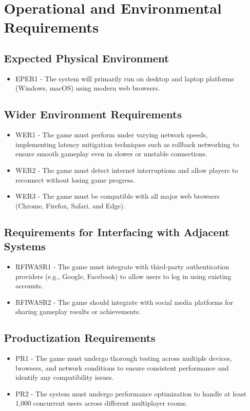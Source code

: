 \documentclass{article}
\begin{document}
\section{Operational and Environmental Requirements}

\subsection{Expected Physical Environment}
\begin{itemize}
    \item EPER1 - The system will primarily run on desktop and laptop platforms (Windows, macOS) using modern web browsers.
\end{itemize}

\subsection{Wider Environment Requirements}
\begin{itemize}
    \item WER1 - The game must perform under varying network speeds, implementing latency mitigation techniques such as rollback networking to ensure smooth gameplay even in slower or unstable connections.
    \item WER2 - The game must detect internet interruptions and allow players to reconnect without losing game progress.
    \item WER3 - The game must be compatible with all major web browsers (Chrome, Firefox, Safari, and Edge).
\end{itemize}

\subsection{Requirements for Interfacing with Adjacent Systems}
\begin{itemize}
    \item RFIWASR1 - The game must integrate with third-party authentication providers (e.g., Google, Facebook) to allow users to log in using existing accounts.
    \item RFIWASR2 - The game should integrate with social media platforms for sharing gameplay results or achievements.
\end{itemize}

\subsection{Productization Requirements}
\begin{itemize}
    \item PR1 - The game must undergo thorough testing across multiple devices, browsers, and network conditions to ensure consistent performance and identify any compatibility issues.
    \item PR2 - The system must undergo performance optimization to handle at least 1,000 concurrent users across different multiplayer rooms.
\end{itemize}
\end{document}
